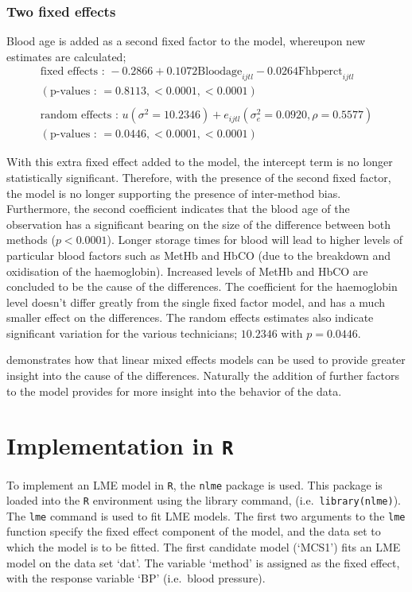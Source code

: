 \documentclass[12pt, a4paper]{report}
\theoremstyle{plain}
\theoremstyle{definition}
\theoremstyle{remark}
\begin{document}
		\subsubsection{Two fixed effects}
		Blood age is added as a second fixed factor to the model,
		whereupon new estimates are calculated;
		\begin{eqnarray}
		\mbox{fixed effects :   } -0.2866 + 0.1072 \mbox{Bloodage}_{ijtl}
		- 0.0264\mbox{Fhbperct}_{ijtl}\nonumber\\
		( \mbox{p-values :   } = 0.8113, <0.0001, <0.0001)\nonumber\\\nonumber\\
		\mbox{random effects :   } u(\sigma^{2}=10.2346) + e_{ijtl}
		(\sigma^{2}_{e}=0.0920, \rho= 0.5577) \nonumber\\
		(\mbox{p-values :   } = 0.0446, <0.0001, <0.0001)
		\end{eqnarray}
		
		
		With this extra fixed effect added to the model, the intercept
		term is no longer statistically significant. Therefore, with the
		presence of the second fixed factor, the model is no longer
		supporting the presence of inter-method bias. Furthermore, the
		second coefficient indicates that the blood age of the observation
		has a significant bearing on the size of the difference between
		both methods ($p <0.0001$). Longer storage times for blood will
		lead to higher levels of particular blood factors such as MetHb
		and HbCO (due to the breakdown and oxidisation of the
		haemoglobin). Increased levels of MetHb and HbCO are concluded to
		be the cause of the differences. The coefficient for the
		haemoglobin level doesn't differ greatly from the single fixed
		factor model, and has a much smaller effect on the differences.
		The random effects estimates also indicate significant variation
		for the various technicians; $10.2346$ with $p=0.0446$.
		
		\citet{LaiShiao} demonstrates how that linear mixed effects models
		can be used to provide greater insight into the cause of the
		differences. Naturally the addition of further factors to the
		model provides for more insight into the behavior of the data.
		
		\section{Implementation in \texttt{R}}
		To implement an LME model in \texttt{R}, the \texttt{nlme} package is used. This package is loaded into the \texttt{R} environment using the library command, (i.e.\ \texttt{library(nlme)}). The \texttt{lme} command is used to fit LME models. The first two arguments to the \texttt{lme} function specify the fixed effect component of the model, and the data set to which the model is to be fitted. The first candidate model (`MCS1') fits an LME model on the data set `dat'. The variable `method' is assigned as the fixed effect, with the response variable `BP' (i.e.\ blood pressure).
		
\end{document}
